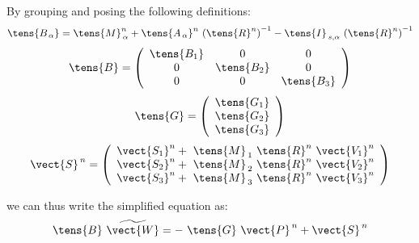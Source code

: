 By grouping and posing the following definitions:
$$ \tens{B_{\,\alpha}} =  \tens{M}_{\,\alpha}^n + \tens{A_{\,\alpha}}^n\ {(\tens{R}^n)}^{-1} - \tens{I}_{\,s,\alpha}\ {(\tens{R}^n)}^{-1}$$
$$ \tens{B} = \left(
                    \begin{array} {ccc}
                    \tens{B_1} & 0 & 0 \\
                    0 & \tens{B_2} & 0 \\
                    0 & 0 & \tens{B_3}
                    \end{array}
              \right)
$$
$$ \tens{G} = \left(
                    \begin{array} {c}
                    \tens{G_1} \\
                    \tens{G_2} \\
                    \tens{G_3}
                    \end{array}
              \right)
$$
$$ \vect{S}^{\,n} = \left(
                      \begin{array} {c}
                      \vect{S_1}^n+\ \tens{M}_{\,1}\ \tens{R}^n\ \vect{V_1}^n\\
                      \vect{S_2}^n+\ \tens{M}_{\,2}\ \tens{R}^n\ \vect{V_2}^n\\
                      \vect{S_3}^n+\ \tens{M}_{\,3}\ \tens{R}^n\ \vect{V_3}^n
                      \end{array}
                \right)
$$

we can thus write the simplified equation as:
\begin{equation}
\tens{B}\ \widetilde{\vect{W}} = -\ \tens{G}\ \vect{P}^{\,n} + \vect{S}^{\,n}
\label{Base_Resopv_eqn3}
\end{equation}

